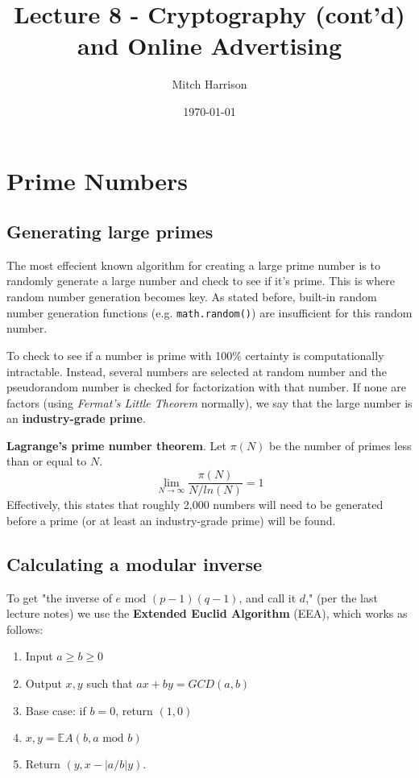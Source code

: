 \documentclass[titlepage, 12pt, leqno]{article}
\title{\Huge{Lecture 8 - Cryptography (cont'd) and Online Advertising}}
\author{\large{Mitch Harrison}}
\date{\today}
\begin{document}
\setlength{\parskip}{1\baselineskip}
\setlength{\parindent}{15pt}
\maketitle
\tableofcontents
\newpage


\section{Prime Numbers}

\subsection{Generating large primes}
The most effecient known algorithm for creating a large prime number is to 
randomly generate a large number and check to see if it's prime. This is where
random number generation becomes key. As stated before, built-in random number
generation functions (e.g. \texttt{math.random()}) are insufficient for this
random number.

To check to see if a number is prime with 100\% certainty is computationally
intractable. Instead, several numbers are selected at random number and the 
pseudorandom number is checked for factorization with that number. If none are
factors (using \textit{Fermat's Little Theorem} normally), we say that the large
number is an \textbf{industry-grade prime}.

\begin{definition}
    \textbf{Lagrange's prime number theorem}. Let $\pi(N)$ be the number of primes
    less than or equal to $N$.
    \[
    \lim_{N \to \infty} \frac{\pi(N)}{N/ln(N)} = 1
    \]
    Effectively, this states that roughly 2,000 numbers will need to be
    generated before a prime (or at least an industry-grade prime) will be found.
\end{definition}

\subsection{Calculating a modular inverse}
To get "the inverse of $e \text{ mod } (p-1)(q-1)$, and call it $d$," (per the
last lecture notes) we use the \textbf{Extended Euclid Algorithm} (EEA), which 
works as follows:

\begin{enumerate}
    \item Input $a \ge b \ge 0$
    \item Output $x,y$ such that $ax + by = GCD(a,b)$
    \item Base case: if $b = 0$, return $(1,0)$
    \item $x,y = \mathbb{E}A(b,a \text{ mod }b)$ 
    \item Return $(y, x - |a/b|y)$.
\end{enumerate}
\end{document}
